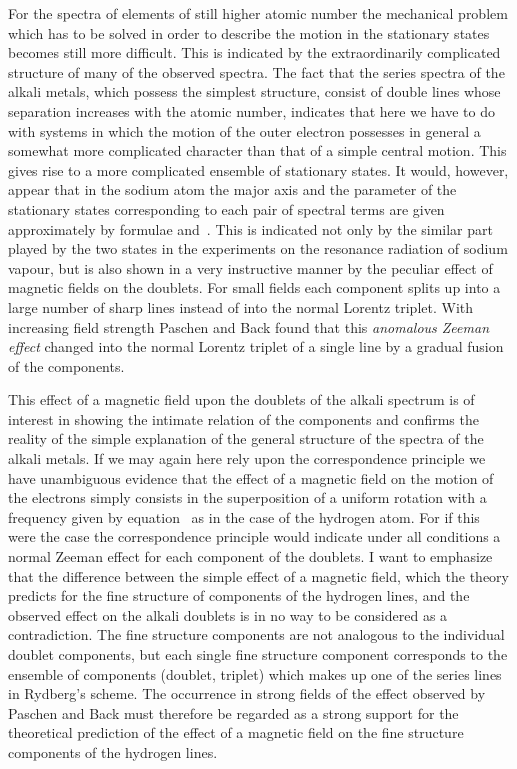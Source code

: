 For the spectra of elements
of still higher atomic number the mechanical problem which has to
be solved in order to describe the motion in the stationary states
becomes still more difficult. This is indicated by the extraordinarily
complicated structure of many of the observed spectra. The fact that
the series spectra of the alkali metals, which possess the simplest
structure, consist of double lines whose separation increases with
the atomic number, indicates that here we have to do with systems
in which the motion of the outer electron possesses in general a
somewhat more complicated character than that of a simple central
motion. This gives rise to a more complicated ensemble of stationary
states. It would, however, appear that in the sodium atom the major
axis and the parameter of the stationary states corresponding to
each pair of spectral terms are given approximately by formulae
 and~. This is indicated not only by the similar part played
by the two states in the experiments on the resonance radiation of
sodium vapour, but is also shown in a very instructive manner by
the peculiar effect of magnetic fields on the doublets. For small
fields each component splits up into a large number of sharp lines
instead of into the normal Lorentz triplet. With increasing field
strength Paschen and Back found that this \emph{anomalous Zeeman effect}
changed into the normal Lorentz triplet of a single line by a gradual
fusion of the components.

This effect of a magnetic field upon the doublets of the alkali
spectrum is of interest in showing the intimate relation of the components
and confirms the reality of the simple explanation of the
general structure of the spectra of the alkali metals. If we may
again here rely upon the correspondence principle we have unambiguous
evidence that the effect of a magnetic field on the motion
of the electrons simply consists in the superposition of a uniform
rotation with a frequency given by equation~ as in the case of
the hydrogen atom. For if this were the case the correspondence
principle would indicate under all conditions a normal Zeeman effect
for each component of the doublets. I want to emphasize that the
difference between the simple effect of a magnetic field, which the
theory predicts for the fine structure of components of the hydrogen
lines, and the observed effect on the alkali doublets is in no way to
be considered as a contradiction. The fine structure components
are not analogous to the individual doublet components, but each
single fine structure component corresponds to the ensemble of
components (doublet, triplet) which makes up one of the series lines
in Rydberg's scheme. The occurrence in strong fields of the effect
observed by Paschen and Back must therefore be regarded as a
strong support for the theoretical prediction of the effect of a magnetic
field on the fine structure components of the hydrogen lines.

